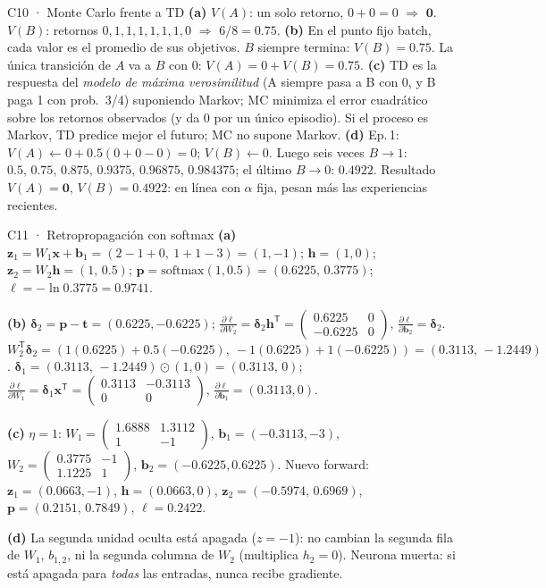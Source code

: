 \begin{solucion}{C10 · Monte Carlo frente a TD}
\textbf{(a)} $V(A)$: un solo retorno, $0+0=0$ $\Rightarrow$ $\mathbf0$. $V(B)$: retornos $0,1,1,1,1,1,1,0$ $\Rightarrow$ $6/8=\mathbf{0.75}$.
\textbf{(b)} En el punto fijo batch, cada valor es el promedio de sus objetivos. $B$ siempre termina: $V(B)=0.75$. La única transición de $A$
va a $B$ con 0: $V(A)=0+V(B)=\mathbf{0.75}$.
\textbf{(c)} TD es la respuesta del \emph{modelo de máxima verosimilitud} (A siempre pasa a B con 0, y B paga 1 con prob.\ 3/4) suponiendo Markov;
MC minimiza el error cuadrático sobre los retornos observados (y da 0 por un único episodio). Si el proceso es Markov, TD predice mejor el futuro; MC
no supone Markov.
\textbf{(d)} Ep.\,1: $V(A)\leftarrow0+0.5(0+0-0)=0$; $V(B)\leftarrow0$. Luego seis veces $B\to1$: $0.5,\,0.75,\,0.875,\,0.9375,\,0.96875,\,0.984375$; el último
$B\to0$: $0.4922$. Resultado $V(A)=\mathbf0$, $V(B)=\mathbf{0.4922}$: en línea con $\alpha$ fija, pesan más las experiencias recientes.
\end{solucion}

\begin{solucion}{C11 · Retropropagación con softmax}
\textbf{(a)} $\mathbf z_1=W_1\mathbf x+\mathbf b_1=(2-1+0,\ 1+1-3)=(1,-1)$; $\mathbf h=(1,0)$; $\mathbf z_2=W_2\mathbf h=(1,\,0.5)$;
$\mathbf p=\mathrm{softmax}(1,0.5)=(0.6225,\,0.3775)$; $\ell=-\ln0.3775=\mathbf{0.9741}$.

\textbf{(b)} $\boldsymbol\delta_2=\mathbf p-\mathbf t=(0.6225,-0.6225)$;
$\frac{\partial\ell}{\partial W_2}=\boldsymbol\delta_2\mathbf h^\mathsf T=\begin{pmatrix}0.6225&0\\-0.6225&0\end{pmatrix}$, $\frac{\partial\ell}{\partial\mathbf b_2}=\boldsymbol\delta_2$.
$W_2^\mathsf T\boldsymbol\delta_2=(1(0.6225)+0.5(-0.6225),\ -1(0.6225)+1(-0.6225))=(0.3113,\,-1.2449)$.
$\boldsymbol\delta_1=(0.3113,\,-1.2449)\odot(1,0)=(0.3113,\,0)$;
$\frac{\partial\ell}{\partial W_1}=\boldsymbol\delta_1\mathbf x^\mathsf T=\begin{pmatrix}0.3113&-0.3113\\0&0\end{pmatrix}$, $\frac{\partial\ell}{\partial\mathbf b_1}=(0.3113,0)$.

\textbf{(c)} $\eta=1$: $W_1=\begin{pmatrix}1.6888&1.3112\\1&-1\end{pmatrix}$, $\mathbf b_1=(-0.3113,-3)$, $W_2=\begin{pmatrix}0.3775&-1\\1.1225&1\end{pmatrix}$, $\mathbf b_2=(-0.6225,0.6225)$.
Nuevo forward: $\mathbf z_1=(0.0663,-1)$, $\mathbf h=(0.0663,0)$, $\mathbf z_2=(-0.5974,\,0.6969)$, $\mathbf p=(0.2151,\,0.7849)$, $\ell=\mathbf{0.2422}$.

\textbf{(d)} La segunda unidad oculta está apagada ($z=-1$): no cambian la segunda fila de $W_1$, $b_{1,2}$, ni la segunda columna de $W_2$
(multiplica $h_2=0$). Neurona muerta: si está apagada para \emph{todas} las entradas, nunca recibe gradiente.
\end{solucion}


